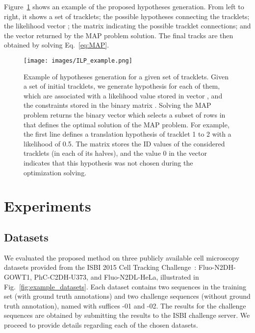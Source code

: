 \documentclass{article}
\begin{document}
Figure~\ref{fig:ILP_example} shows an example of the proposed hypotheses generation. From left to right, it shows a set of tracklets; the possible hypotheses connecting the tracklets; the likelihood vector ; the matrix  indicating the possible tracklet connections; and the vector  returned by the MAP problem solution. The final tracks are then obtained by solving Eq.~\eqref{eq:MAP}.

\begin{figure}[]
    \centering
    \texttt{[image: images/ILP\_example.png]}
    \caption[Example of hypotheses generation for a given set of tracklets.]{Example of hypotheses generation for a given set of tracklets. Given a set of initial tracklets, we generate hypothesis for each of them, which are associated with a likelihood value stored in vector , and the constraints stored in the binary matrix . Solving the MAP problem returns the binary vector  which selects a subset of rows in  that defines the optimal solution of the MAP problem. For example, the first line defines a translation hypothesis of tracklet 1 to 2 with a likelihood of 0.5. The matrix  stores the ID values of the considered tracklets (in each of its halves), and the value 0 in the vector  indicates that this hypothesis was not chosen during the optimization solving.}
    \label{fig:ILP_example}
\end{figure}

\section{Experiments}

\subsection{Datasets}\label{sec:datasets}

We evaluated the proposed method on three publicly available cell microscopy datasets provided from the ISBI 2015 Cell Tracking Challenge~\cite{isbi}: Fluo-N2DH-GOWT1, PhC-C2DH-U373, and Fluo-N2DL-HeLa, illustrated in Fig.~\ref{fig:example_datasets}. Each dataset contains two sequences in the training set (with ground truth annotations) and two challenge sequences (without ground truth annotation), named with suffices -01 and -02. The results for the challenge sequences are obtained by submitting the results to the ISBI challenge server. We proceed to provide details regarding each of the chosen datasets.

\begin{figure*}[]
\centering
{}~
~
\caption{Example of cell images for each of the datasets used for evaluation.}
\label{fig:example_datasets}
\end{figure*}
\end{document}
